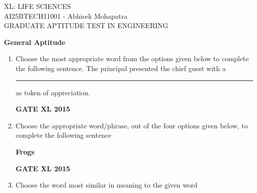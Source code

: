 \documentclass[journal,12pt,onecolumn]{IEEEtran}
\begin{document}
\begin{center}
    \huge{XL: LIFE SCIENCES}\\
    \large{AI25BTECH11001 - Abhisek Mohapatra}\\
    \large{GRADUATE APTITUDE TEST IN ENGINEERING}
\end{center}
\textbf{General Aptitude}
\begin{enumerate}

\item Choose the most appropriate word from the options given below to complete the following sentence. 
	The principal presented the chief guest with a \rule{1cm}{0.15mm} as token of appreciation.
    \begin{enumerate}
    \end{enumerate}

\begin{flushright}\textbf{GATE XL 2015}\end{flushright}

\item Choose the appropriate word/phrase, out of the four options given below, to complete the following sentence

	\textbf{Frogs}
    \begin{enumerate}
    \end{enumerate}

\begin{flushright}\textbf{GATE XL 2015}\end{flushright}
\item Choose the word most similar in meaning to the given word


\end{enumerate}
\end{document}
